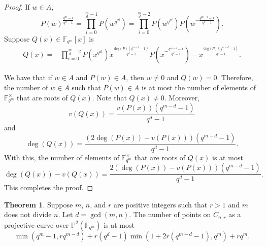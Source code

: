 \documentclass[12pt,letterpaper]{amsart}
\theoremstyle{definition}
\newtheorem{theorem}{Theorem}[section]
\begin{document}
\begin{proof}
If $w\in A$,
\[
    P(w)^{\frac{q^m-1}{q^d-1}} =\prod_{i=0}^{\frac{m}{d}-1}P\left(w^{q^{di}}\right)
    = \prod_{i=0}^{\frac{m}{d}-2} P(w^{q^{di}}) P\left(w^{-\frac{q^{m-d}-1}{q^d-1}}\right).
\]
Suppose $Q(x)\in\mathbb{F}_{q^m}[x]$ is
\begin{align*}
Q(x) = & \prod_{i=0}^{\frac{m}{d}-2} P\left(x^{q^{di}}\right)x^{\frac{\text{deg}(P)(q^{m-d}-1)}{q^d-1}}P\left(x^{-\frac{q^{m-d}-1}{q^d-1}}\right)  -x^{\frac{\text{deg}(P)(q^{m-d}-1)}{q^d-1}}.
\end{align*}

We have that if $w\in A$ and $P(w)\in A$, then $w\not=0$ and $Q(w)=0$. Therefore, the number of $w\in A$ such that $P(w)\in A$ is at most the number of elements of $\mathbb{F}_{q^m}^{\times}$ that are roots of $Q(x)$. Note that $Q(x)\not=0$. Moreover,
\[
v(Q(x))=\frac{v(P(x))(q^{m-d}-1)}{q^d-1}
\]
and 
\[
\deg(Q(x))=\frac{(2\deg(P(x))-v(P(x)))(q^{m-d}-1)}{q^d-1}.
\]
With this, the number of elements of $\mathbb{F}_{q^m}^{\times}$ that are roots of $Q(x)$ is at most
\[
\deg(Q(x))-v(Q(x))=\frac{2(\deg(P(x))-v(P(x)))(q^{m-d}-1)}{q^d-1}.
\]
This completes the proof.
\end{proof}

\begin{theorem}
\label{thm:numpoints2}
Suppose $m$, $n$, and $r$ are positive integers such that $r>1$ and $m$ does not divide $n$. Let $d=\gcd(m,n)$. The number of points on $C_{n,r}$ as a projective curve over $\mathbb{P}^2(\mathbb{F}_{q^m})$ is at most
\[
\min(q^m-1, rq^{m-d})+r(q^d-1)\min(1+2r(q^{m-d}-1), q^m)+rq^m.
\]
\end{theorem}
\end{document}
